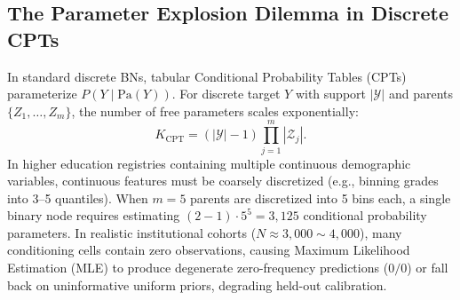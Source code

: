 \subsection{The Parameter Explosion Dilemma in Discrete CPTs}

In standard discrete BNs, tabular Conditional Probability Tables (CPTs) parameterize $P(Y \mid \text{Pa}(Y))$. For discrete target $Y$ with support $|\mathcal{Y}|$ and parents $\{Z_1, \dots, Z_m\}$, the number of free parameters scales exponentially:
\begin{equation}
    K_{\text{CPT}} = (|\mathcal{Y}| - 1) \prod_{j=1}^m |\mathcal{Z}_j|.
    \label{eq:cpt_explosion}
\end{equation}
In higher education registries containing multiple continuous demographic variables, continuous features must be coarsely discretized (e.g., binning grades into 3--5 quantiles). When $m = 5$ parents are discretized into 5 bins each, a single binary node requires estimating $(2 - 1) \cdot 5^5 = 3,125$ conditional probability parameters. In realistic institutional cohorts ($N \approx 3,000 \sim 4,000$), many conditioning cells contain zero observations, causing Maximum Likelihood Estimation (MLE) to produce degenerate zero-frequency predictions ($0/0$) or fall back on uninformative uniform priors, degrading held-out calibration.
